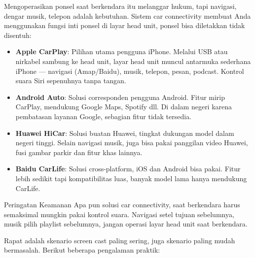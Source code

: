 
Mengoperasikan ponsel saat berkendara itu melanggar hukum, tapi navigasi, dengar musik, telepon adalah kebutuhan. Sistem car connectivity membuat Anda menggunakan fungsi inti ponsel di layar head unit, ponsel bisa diletakkan tidak disentuh:

\begin{itemize}
  \item \textbf{Apple CarPlay}: Pilihan utama pengguna iPhone. Melalui USB atau nirkabel sambung ke head unit, layar head unit muncul antarmuka sederhana iPhone — navigasi (Amap/Baidu), musik, telepon, pesan, podcast. Kontrol suara Siri sepenuhnya tanpa tangan.
  \item \textbf{Android Auto}: Solusi corresponden pengguna Android. Fitur mirip CarPlay, mendukung Google Maps, Spotify dll. Di dalam negeri karena pembatasan layanan Google, sebagian fitur tidak tersedia.
  \item \textbf{Huawei HiCar}: Solusi buatan Huawei, tingkat dukungan model dalam negeri tinggi. Selain navigasi musik, juga bisa pakai panggilan video Huawei, fusi gambar parkir dan fitur khas lainnya.
  \item \textbf{Baidu CarLife}: Solusi cross-platform, iOS dan Android bisa pakai. Fitur lebih sedikit tapi kompatibilitas luas, banyak model lama hanya mendukung CarLife.
\end{itemize}

\begin{tcbwarn}{Peringatan Keamanan}
Apa pun solusi car connectivity, saat berkendara harus semaksimal mungkin pakai kontrol suara. Navigasi setel tujuan sebelumnya, musik pilih playlist sebelumnya, jangan operasi layar head unit saat berkendara.

\end{tcbwarn}


Rapat adalah skenario screen cast paling sering, juga skenario paling mudah bermasalah. Berikut beberapa pengalaman praktik:

